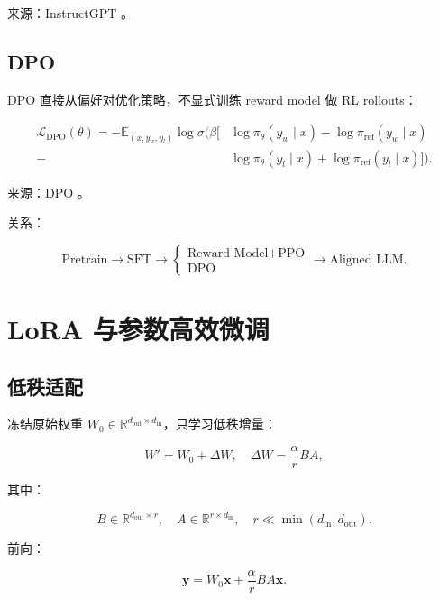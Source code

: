 \documentclass[UTF8,12pt]{ctexart}
\newcommand{\R}{\mathbb{R}}
\newcommand{\E}{\mathbb{E}}
\newcommand{\1}{\mathbf{1}}
\begin{document}
来源：InstructGPT \cite{ouyang2022instructgpt}。

\subsection{DPO}

DPO 直接从偏好对优化策略，不显式训练 reward model 做 RL rollouts：

\begin{align}
\mathcal{L}_{\mathrm{DPO}}(\theta)
=-\E_{(x,y_w,y_l)}
\log\sigma\Big(
\beta[
&\log\pi_\theta(y_w\mid x)-\log\pi_{\mathrm{ref}}(y_w\mid x)\\
-&\log\pi_\theta(y_l\mid x)+\log\pi_{\mathrm{ref}}(y_l\mid x)]
\Big).
\label{eq:dpo}
\end{align}

来源：DPO \cite{rafailov2023dpo}。

关系：

\[
\text{Pretrain}
\rightarrow
\text{SFT}
\rightarrow
\begin{cases}
\text{Reward Model}+\text{PPO}\\
\text{DPO}
\end{cases}
\rightarrow
\text{Aligned LLM}.
\]

\section{LoRA 与参数高效微调}

\subsection{低秩适配}

冻结原始权重 $W_0\in\R^{d_{\mathrm{out}}\times d_{\mathrm{in}}}$，只学习低秩增量：

\begin{equation}
W'=W_0+\Delta W,
\quad
\Delta W=\frac{\alpha}{r}BA,
\end{equation}

其中：

\begin{equation}
B\in\R^{d_{\mathrm{out}}\times r},
\quad
A\in\R^{r\times d_{\mathrm{in}}},
\quad
r\ll \min(d_{\mathrm{in}},d_{\mathrm{out}}).
\end{equation}

前向：

\begin{equation}
\bm{y}=W_0\bm{x}+\frac{\alpha}{r}BA\bm{x}.
\label{eq:lora}
\end{equation}
\end{document}
